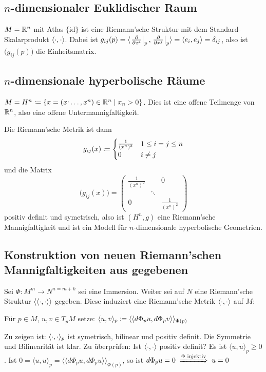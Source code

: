 \documentclass[a4paper,twoside,DIV15,BCOR12mm]{scrbook}
\begin{document}
\subsection{$n$-dimensionaler Euklidischer Raum}
$M=\mathbb{R}^n$ mit Atlas $\{\text{id}\}$ ist eine Riemann’sche Struktur mit dem Standard-Skalarprodukt $\langle\cdot,\cdot\rangle$. Dabei ist $g_{ij}(p) = \langle \left.\frac{\partial}{\partial x^{i}}\right|_p, \left.\frac{\partial}{\partial x^{j}}\right|_p \rangle = \langle e_i, e_j \rangle = \delta_{ij}$, also ist $\big(g_{ij}(p)\big)$ die Einheitsmatrix.

\subsection{$n$-dimensionale hyperbolische Räume}
$M = H^n \da \{ x = (x^,\ldots, x^n) \in \MdR^n \mid x_n > 0 \}$. Dies ist eine offene Teilmenge von $\mathbb{R}^n$, also eine offene Untermannigfaltigkeit.

Die Riemann’sche Metrik ist dann 
\[
g_{ij}(x) \da 
\begin{cases}
\frac 1 {(x^n)^2} & 1\le i = j \le n \\
0 & i \ne j
\end{cases}
\]
und die Matrix 
\[
\big(g_{ij}(x)\big) = 
\begin{pmatrix}
\frac 1 {(x^n)^2}& & 0 \\
& \ddots & \\
0 & & \frac 1 {(x^n)^2}
\end{pmatrix}
\]
positiv definit und symetrisch, also ist $(H^n, g)$ eine Riemann’sche Mannigfaltigkeit und ist ein Modell für $n$-dimensionale hyperbolische Geometrien.

\subsection{Konstruktion von neuen Riemann’schen Mannigfaltigkeiten aus gegebenen}

Sei $\Phi: M^m \to N^{n=m+k}$ sei eine Immersion. Weiter sei auf $N$ eine Riemann’sche Struktur $\langle\langle\cdot,\cdot\rangle\rangle$ gegeben. Diese induziert eine Riemann’sche Metrik $\langle\cdot,\cdot\rangle$ auf $M$:

Für $p\in M$, $u,v\in T_pM$ setze: $\langle u,v\rangle_p \da \langle\langle d\Phi_pu, d\Phi_p v \rangle\rangle_{\Phi(p)}$

Zu zeigen ist: $\langle\cdot,\cdot\rangle_p$ ist symetrisch, bilinear und positiv definit. Die Symmetrie und Bilinearität ist klar. Zu überprüfen: Ist $\langle\cdot,\cdot\rangle$ positiv definit? Es ist $\langle u,u\rangle_p \ge 0$. Ist $0 = \langle u,u\rangle_p = \langle\langle d\Phi_pu,d\Phi_pu\rangle\rangle_{\Phi(p)}$, so ist $d\Phi_pu = 0 \folgtnach{$\Phi$ injektiv} u = 0$
\end{document}
